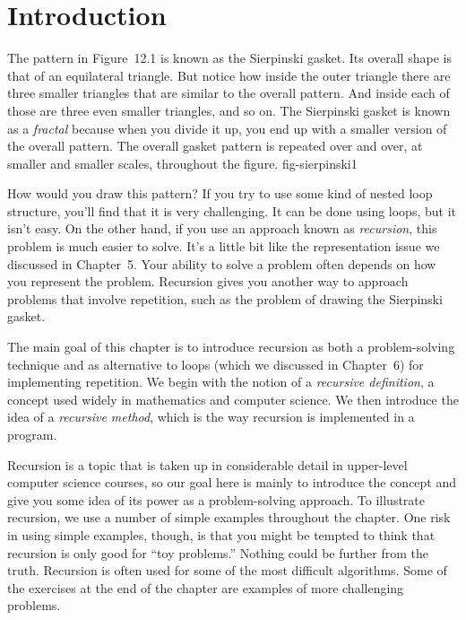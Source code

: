 \section{Introduction}
\noindent The pattern in Figure~12.1 is known as the Sierpinski
gasket.  Its overall shape is that of an equilateral triangle.  But
notice how inside the outer triangle there are three smaller
triangles that are similar to the overall pattern.  And inside each of
those are three even smaller triangles, and so on.   The Sierpinski
gasket is known as a {\it fractal} because when you divide it up, you
end up with a smaller version of the overall pattern.  The overall
gasket pattern is repeated over and over, at smaller and smaller
scales, throughout the figure.
  {fig-sierpinski1}


How would you draw this pattern?  If you try to use some kind of
nested loop structure, you'll find that it is very challenging.   It
can be done using loops, but it isn't easy.  On the other hand, if you
use an approach known as {\it recursion}, this problem is much easier
to solve.  It's a little bit like the representation issue we discussed
in Chapter~5. Your ability to solve a problem often
depends on how you represent the problem.  Recursion gives you another
way to approach problems that involve repetition, such as the problem
of drawing the Sierpinski gasket.

The main goal of this chapter is to introduce recursion as both a
problem-solving technique and as alternative to loops
(which we discussed in Chapter~6) for implementing repetition.  We
begin with the notion of a {\it recursive definition}, a concept used
widely in mathematics and computer science.  We then introduce the
idea of a {\it recursive method}, which is the way recursion is implemented
in a program.  

Recursion is a topic that is taken up in considerable detail in
upper-level computer science courses, so our goal here is mainly to
introduce the concept and give you some idea of its power as a
problem-solving approach.  To illustrate recursion, we use a number of
simple examples throughout the chapter.  One risk in using simple
examples, though, is that you might be tempted to think that recursion
is only good for ``toy problems.'' Nothing could be further from the
truth.  Recursion is often used for some of the most difficult
algorithms.  Some of the exercises at the end of the chapter are
examples of more challenging problems.


